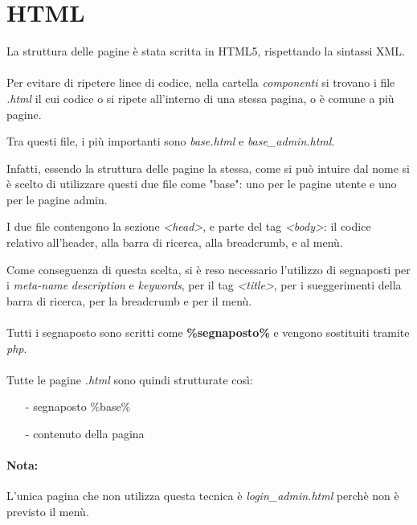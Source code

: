 \documentclass[a4paper]{article}
\begin{document}
\section{HTML}
La struttura delle pagine è stata scritta in HTML5, rispettando la sintassi XML.

\paragraph{}Per evitare di ripetere linee di codice, nella cartella \textit{componenti} si trovano i file \textit{.html} il cui codice o si ripete all'interno di una stessa pagina, o è comune a più pagine.

\noindent Tra questi file, i più importanti sono \textit{base.html} e \textit{base\_admin.html}.

\noindent Infatti, essendo la struttura delle pagine la stessa, come si può intuire dal nome si è scelto di utilizzare questi due file come "base": uno per le pagine utente e uno per le pagine admin.

\noindent I due file contengono la sezione \textit{<head>}, e parte del tag \textit{<body>}: il codice relativo all'header, alla barra di ricerca, alla breadcrumb, e al menù.

\noindent Come conseguenza di questa scelta, si è reso necessario l'utilizzo di segnaposti per i \textit{meta-name} \textit{description} e \textit{keywords}, per il tag \textit{<title>}, per i sueggerimenti della barra di ricerca, per la breadcrumb e per il menù.

\paragraph*{}Tutti i segnaposto sono scritti come \textbf{\%segnaposto\%} e vengono sostituiti tramite \textit{php}.

\paragraph*{}Tutte le pagine \textit{.html} sono quindi strutturate così:
\begin{itemize}
    \item [-] segnaposto \%base\%
    \item [-] contenuto della pagina
\end{itemize}

\paragraph*{Nota:}L'unica pagina che non utilizza questa tecnica è \textit{login\_admin.html} perchè non è previsto il menù.
\end{document}
